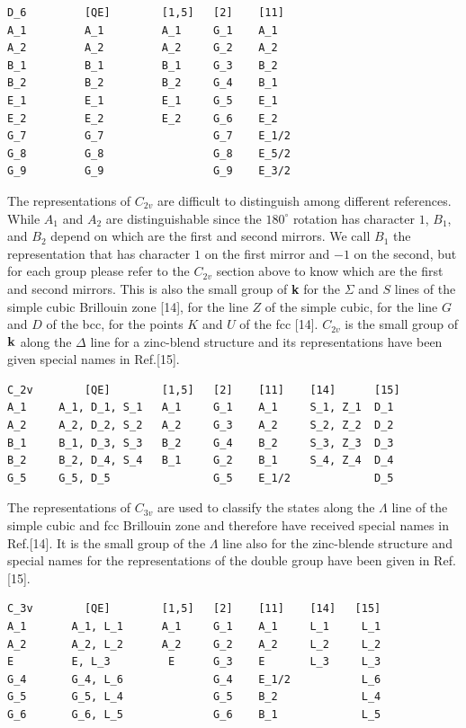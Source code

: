 \documentclass[12pt,a4paper]{article}
\begin{document}
\begin{verbatim}
D_6         [QE]        [1,5]   [2]    [11]
A_1         A_1         A_1     G_1    A_1
A_2         A_2         A_2     G_2    A_2
B_1         B_1         B_1     G_3    B_2               
B_2         B_2         B_2     G_4    B_1
E_1         E_1         E_1     G_5    E_1
E_2         E_2         E_2     G_6    E_2
G_7         G_7                 G_7    E_1/2
G_8         G_8                 G_8    E_5/2 
G_9         G_9                 G_9    E_3/2  
\end{verbatim}

The representations of $C_{2v}$ are difficult to distinguish among different
references. While $A_1$ and $A_2$ are distinguishable since the 
$180^\circ$ rotation has character $1$, $B_1$, and $B_2$ depend on which 
are the first and second mirrors. 
We call $B_1$ the representation that has character $1$ on the first mirror and 
$-1$ on the second, but for each group please refer to the $C_{2v}$ section
above to know which are the first and second mirrors. 
This is also the small group
of {\bf k} for the $\Sigma$ and $S$ lines of the simple cubic Brillouin 
zone [14],
for the line $Z$ of the simple cubic, for the line $G$ and $D$ of the bcc, 
for the points $K$ and $U$ of the fcc [14]. $C_{2v}$ is the small group
of ${\bf k}$ along the $\Delta$ line for a zinc-blend structure and
its representations have been given special names in Ref.[15]. 
\begin{verbatim}
C_2v        [QE]        [1,5]   [2]    [11]    [14]      [15]
A_1     A_1, D_1, S_1   A_1     G_1    A_1     S_1, Z_1  D_1
A_2     A_2, D_2, S_2   A_2     G_3    A_2     S_2, Z_2  D_2
B_1     B_1, D_3, S_3   B_2     G_4    B_2     S_3, Z_3  D_3
B_2     B_2, D_4, S_4   B_1     G_2    B_1     S_4, Z_4  D_4
G_5     G_5, D_5                G_5    E_1/2             D_5
\end{verbatim}

The representations of $C_{3v}$ are used to classify the states along the 
$\Lambda$ line of the simple cubic and fcc Brillouin zone and therefore have
received special names in Ref.[14]. It is the small group of the $\Lambda$ 
line also for the zinc-blende structure and special names for the 
representations of the double group have been given in Ref.[15].
\begin{verbatim}
C_3v        [QE]        [1,5]   [2]    [11]    [14]   [15]
A_1       A_1, L_1      A_1     G_1    A_1     L_1     L_1
A_2       A_2, L_2      A_2     G_2    A_2     L_2     L_2
E         E, L_3         E      G_3    E       L_3     L_3
G_4       G_4, L_6              G_4    E_1/2           L_6
G_5       G_5, L_4              G_5    B_2             L_4
G_6       G_6, L_5              G_6    B_1             L_5
\end{verbatim}
\end{document}
